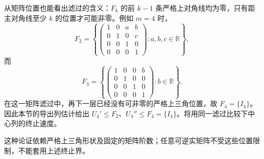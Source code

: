 从矩阵位置也能看出滤过的含义：\(F_k\) 的前 \(k-1\) 条严格上对角线均为零，只有距主对角线至少 \(k\) 的位置才可能非零。例如 \(m=4\) 时，
\[
	F_2=\left\{\begin{pmatrix}
		1&0&a&b\\
		0&1&0&c\\
		0&0&1&0\\
		0&0&0&1
	\end{pmatrix}:a,b,c\in\mathbb R\right\},
\]
而
\[
	F_3=\left\{\begin{pmatrix}
		1&0&0&b\\
		0&1&0&0\\
		0&0&1&0\\
		0&0&0&1
	\end{pmatrix}:b\in\mathbb R\right\}.
\]
在这一矩阵滤过中，再下一层已经没有可非零的严格上三角位置，故 \(F_4=\{I_4\}\)。 因此本节的导出列估计给出 \(U_4'\le F_2\)、\(U_4''\le F_4=\{I_4\}\)。将用同一滤过比较下中心列的终止速度。

\ProseParagraphBreak
这种论证依赖严格上三角形状及固定的矩阵阶数；任意可逆实矩阵不受这些位置限制，不能套用上述终止界。
